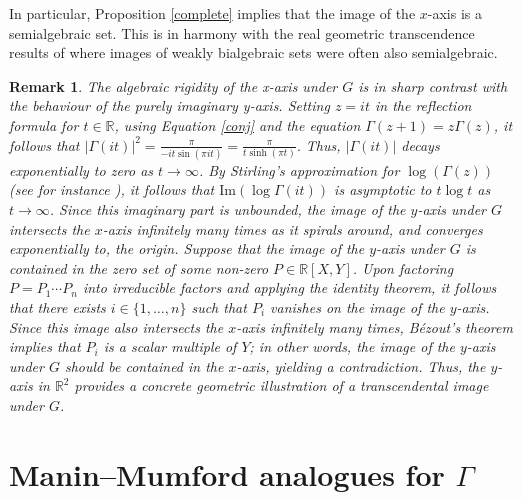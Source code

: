 \documentclass[11pt,reqno]{amsart}
\newtheorem{remark}[theorem]{Remark}
\theoremstyle{definition}
\numberwithin{equation}{section}
\newcommand{\R}{\mathbb{R}}
\renewcommand{\Im}{\mathrm{Im}}
\begin{document}
In particular, Proposition \ref{complete} implies that the image of the $x$-axis is a semialgebraic set. This is in harmony with the real geometric transcendence results of \cite{Tam23, ST25} where images of weakly bialgebraic sets were often also semialgebraic. 


\begin{remark}
The algebraic rigidity of the x-axis under $G$ is in sharp contrast with the behaviour of the purely imaginary y-axis. Setting $z=it$ in the reflection formula for $t \in \R$, using Equation \eqref{conj} and the equation $\Gamma(z+1)=z\Gamma(z)$,  it follows that 
$
|\Gamma(it)|^2 = \frac{\pi}{-it \sin(\pi i t)} = \frac{\pi}{t \sinh(\pi t)}. 
$
Thus, $|\Gamma(it)|$ decays exponentially to zero as $t \to \infty$. By Stirling's approximation for $\log(\Gamma(z))$ (see for instance \cite[Proposition 9.6.27]{Coh07}),  it follows that $\Im(\log \Gamma (it))$ is asymptotic to $t \log t$ as $t \to \infty$. Since this imaginary part is unbounded, the image of the $y$-axis under $G$ intersects the $x$-axis infinitely many times as it spirals around, and converges exponentially to, the origin. Suppose that the image of the $y$-axis under $G$ is contained in the zero set of some non-zero $P \in \R[X, Y]$. Upon factoring $P=P_1 \cdots P_n$ into irreducible factors and applying the identity theorem, it follows that there exists $i \in \{1, \ldots, n\}$ such that $P_i$ vanishes on the image of the $y$-axis. Since this image also intersects the $x$-axis infinitely many times, Bézout's theorem implies that $P_i$ is a scalar multiple of $Y$; in other words, the image of the $y$-axis under $G$ should be contained in the $x$-axis, yielding a contradiction. Thus, the $y$-axis in $\mathbb R^2$ provides a concrete geometric illustration of a transcendental image under $G$.
\end{remark}

\section{Manin--Mumford analogues for $\Gamma$}
\label{mm}
\end{document}
